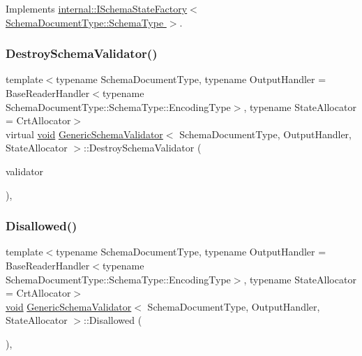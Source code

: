 Implements \hyperlink{classinternal_1_1ISchemaStateFactory_a70b8d88180d2e6993105b17f19101635}{internal\+::\+I\+Schema\+State\+Factory$<$ Schema\+Document\+Type\+::\+Schema\+Type $>$}.

\mbox{\label{classGenericSchemaValidator_ae24fa298e328f1fd7dda2ef6267156d2}} 
\subsubsection{\texorpdfstring{Destroy\+Schema\+Validator()}{DestroySchemaValidator()}}
{\footnotesize\ttfamily template$<$typename Schema\+Document\+Type, typename Output\+Handler = Base\+Reader\+Handler$<$typename Schema\+Document\+Type\+::\+Schema\+Type\+::\+Encoding\+Type$>$, typename State\+Allocator = Crt\+Allocator$>$ \\
virtual \hyperlink{imgui__impl__opengl3__loader_8h_ac668e7cffd9e2e9cfee428b9b2f34fa7}{void} \hyperlink{classGenericSchemaValidator}{Generic\+Schema\+Validator}$<$ Schema\+Document\+Type, Output\+Handler, State\+Allocator $>$\+::Destroy\+Schema\+Validator (\begin{DoxyParamCaption}\item[{I\+Schema\+Validator $\ast$}]{validator }\end{DoxyParamCaption})\hspace{0.3cm}{\ttfamily [inline]}, {\ttfamily [virtual]}}

\mbox{\label{classGenericSchemaValidator_acc65a322086c792d6534e306c7a091cf}} 
\subsubsection{\texorpdfstring{Disallowed()}{Disallowed()}}
{\footnotesize\ttfamily template$<$typename Schema\+Document\+Type, typename Output\+Handler = Base\+Reader\+Handler$<$typename Schema\+Document\+Type\+::\+Schema\+Type\+::\+Encoding\+Type$>$, typename State\+Allocator = Crt\+Allocator$>$ \\
\hyperlink{imgui__impl__opengl3__loader_8h_ac668e7cffd9e2e9cfee428b9b2f34fa7}{void} \hyperlink{classGenericSchemaValidator}{Generic\+Schema\+Validator}$<$ Schema\+Document\+Type, Output\+Handler, State\+Allocator $>$\+::Disallowed (\begin{DoxyParamCaption}{ }\end{DoxyParamCaption})\hspace{0.3cm}{\ttfamily [inline]}, {\ttfamily [virtual]}}



